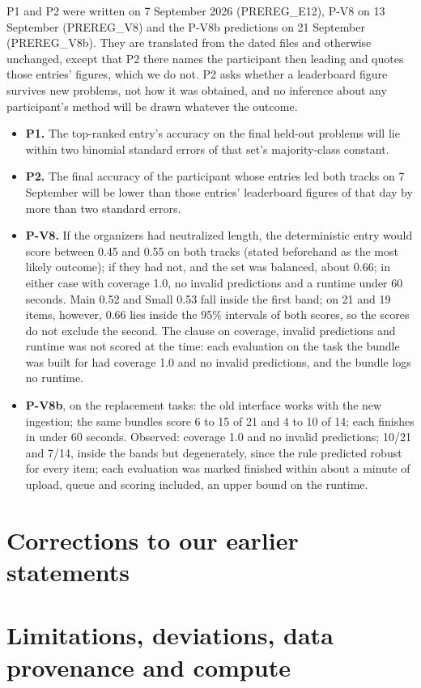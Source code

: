 \documentclass{article}
\begin{document}
P1 and P2 were written on 7 September 2026 (PREREG\_E12), P-V8 on 13 September (PREREG\_V8) and the P-V8b predictions on 21 September (PREREG\_V8b). They are translated from the dated files and otherwise unchanged, except that P2 there names the participant then leading and quotes those entries' figures, which we do not. P2 asks whether a leaderboard figure survives new problems, not how it was obtained, and no inference about any participant's method will be drawn whatever the outcome.

\begin{itemize}
\item \textbf{P1.} The top-ranked entry's accuracy on the final held-out problems will lie within two binomial standard errors of that set's majority-class constant.
\item \textbf{P2.} The final accuracy of the participant whose entries led both tracks on 7 September will be lower than those entries' leaderboard figures of that day by more than two standard errors.
\item \textbf{P-V8.} If the organizers had neutralized length, the deterministic entry would score between 0.45 and 0.55 on both tracks (stated beforehand as the most likely outcome); if they had not, and the set was balanced, about 0.66; in either case with coverage 1.0, no invalid predictions and a runtime under 60 seconds. Main 0.52 and Small 0.53 fall inside the first band; on 21 and 19 items, however, 0.66 lies inside the 95\% intervals of both scores, so the scores do not exclude the second. The clause on coverage, invalid predictions and runtime was not scored at the time: each evaluation on the task the bundle was built for had coverage 1.0 and no invalid predictions, and the bundle logs no runtime.
\item \textbf{P-V8b}, on the replacement tasks: the old interface works with the new ingestion; the same bundles score 6 to 15 of 21 and 4 to 10 of 14; each finishes in under 60 seconds. Observed: coverage 1.0 and no invalid predictions; 10/21 and 7/14, inside the bands but degenerately, since the rule predicted robust for every item; each evaluation was marked finished within about a minute of upload, queue and scoring included, an upper bound on the runtime.
\end{itemize}

\section{Corrections to our earlier statements}\label{app:C}



\section{Limitations, deviations, data provenance and compute}\label{app:D}









\newpage

\end{document}
